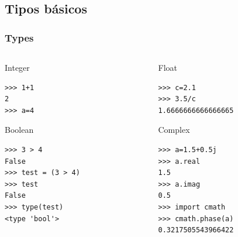 \documentclass[10pt,colorlinks]{beamer}
\begin{document}
\subsection{Tipos básicos}
\begin{frame}[fragile]\frametitle{Types}
 \begin{columns}[T]
\begin{column}{.5\textwidth}
   \begin{block}{Integer}
\tiny
\begin{verbatim}
>>> 1+1
2
>>> a=4
\end{verbatim}

  \end{block}
 \begin{block}{Boolean}
\tiny
\tiny
\begin{verbatim}
>>> 3 > 4
False
>>> test = (3 > 4)
>>> test
False
>>> type(test)
<type 'bool'>
\end{verbatim}

\end{block}
\end{column}
    \begin{column}{.5\textwidth}
 \begin{block}{Float}
\tiny
\begin{verbatim}
>>> c=2.1
>>> 3.5/c
1.6666666666666665
\end{verbatim}


\end{block}
  \begin{block}{Complex}
\tiny
\begin{verbatim}
>>> a=1.5+0.5j
>>> a.real
1.5
>>> a.imag
0.5
>>> import cmath
>>> cmath.phase(a)
0.3217505543966422
\end{verbatim}

  \end{block}

\end{column}
\end{columns}
\end{frame}
\end{document}
